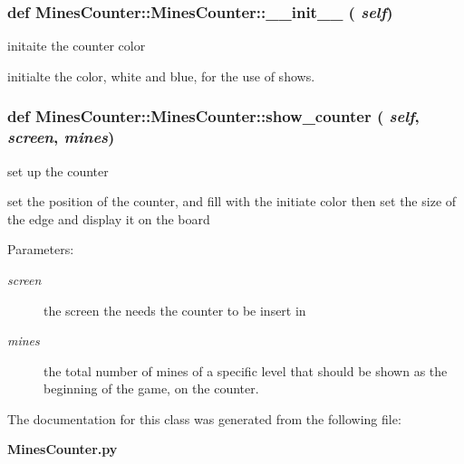 \subsubsection{\setlength{\rightskip}{0pt plus 5cm}def Mines\-Counter::Mines\-Counter::\_\-\_\-init\_\-\_\- ( {\em self})}\label{classMinesCounter_1_1MinesCounter_9bd5ebaaeb1bf971eaf66b05680c7118}


initaite the counter color 

initialte the color, white and blue, for the use of shows. 
\subsubsection{\setlength{\rightskip}{0pt plus 5cm}def Mines\-Counter::Mines\-Counter::show\_\-counter ( {\em self},  {\em screen},  {\em mines})}\label{classMinesCounter_1_1MinesCounter_74a1907491db951d37f6f7005837b55e}


set up the counter 

set the position of the counter, and fill with the initiate color then set the size of the edge and display it on the board \begin{Desc}
\item[Parameters:]
\begin{description}
\item[{\em screen}]the screen the needs the counter to be insert in \item[{\em mines}]the total number of mines of a specific level that should be shown as the beginning of the game, on the counter. \end{description}
\end{Desc}


The documentation for this class was generated from the following file:\begin{CompactItemize}
\item 
\bf{Mines\-Counter.py}\end{CompactItemize}
